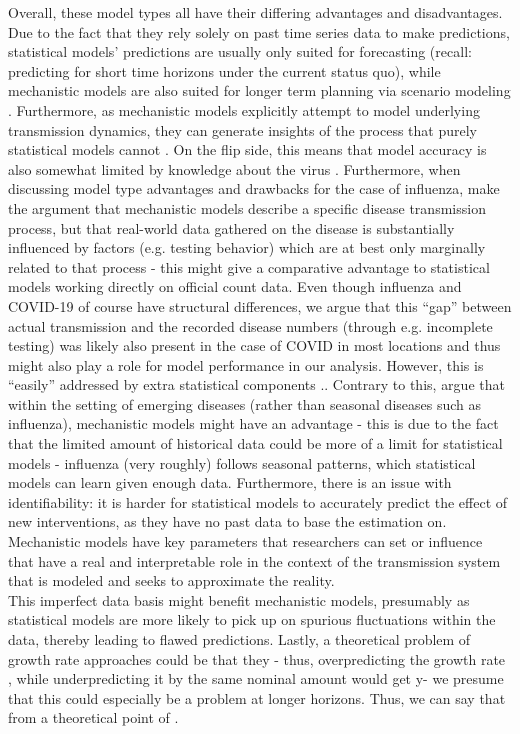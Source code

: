 Overall, these model types all have their differing advantages and disadvantages. Due to the fact that they rely solely on past time series data to make predictions, statistical models' predictions are usually only suited for forecasting (recall: predicting for short time horizons under the current status quo), while mechanistic models are also suited for longer term planning via scenario modeling \citep{reich_collaborative_2022}. Furthermore, as mechanistic models explicitly attempt to model underlying transmission dynamics, they can generate insights of the process that purely statistical models cannot \cite{james_use_2021} . On the flip side, this means that model accuracy is also somewhat limited by knowledge about the virus \citep{holmdahl_wrong_2020}. Furthermore, when discussing model type advantages and drawbacks for the case of influenza, \cite{reich_collaborative_2019} make the argument that mechanistic models describe a specific disease transmission process, but that real-world data gathered on the disease is substantially influenced by factors (e.g. testing behavior) which are at best only marginally related to that process - this might give a comparative advantage to statistical models working directly on official count data. Even though influenza and COVID-19 of course have structural differences, we argue that this ``gap'' between actual transmission and the recorded disease numbers (through e.g. incomplete testing) was likely also present in the case of COVID in most locations and thus might also play a role for model performance in our analysis. However, this is ``easily'' addressed by extra statistical components .. Contrary to this, \cite{bracher_evaluating_2021} argue that within the setting of emerging diseases (rather than seasonal diseases such as influenza), mechanistic models might have an advantage - this is due to the fact that the limited amount of historical data could be more of a limit for statistical models - influenza (very roughly) follows seasonal patterns, which statistical models can learn given enough data. Furthermore, there is an issue with identifiability: it is harder for statistical models to accurately predict the effect of new interventions, as they have no past data to base the estimation on. Mechanistic models have key parameters that researchers can set or influence that have a real and interpretable role in the context of the transmission system that is modeled and seeks to approximate the reality.\\ 
This imperfect data basis might benefit mechanistic models, presumably as statistical models are more likely to pick up on spurious fluctuations within the data, thereby leading to flawed predictions. Lastly, a theoretical problem of growth rate approaches could be that they - thus, overpredicting the growth rate , while underpredicting it by the same nominal  amount would get y- we presume that this could especially be a problem at longer horizons. Thus, we can say that from a theoretical point of .\\
